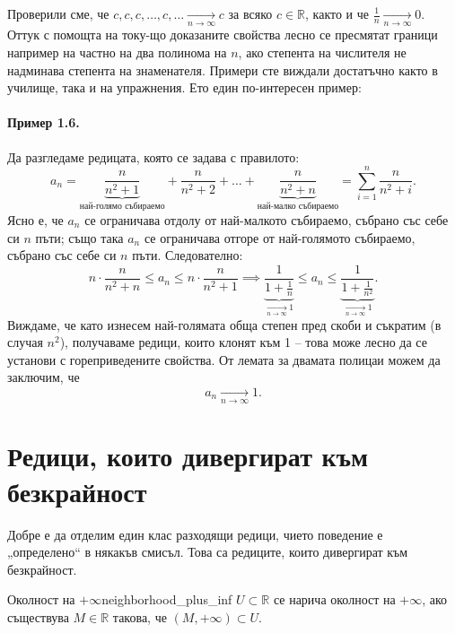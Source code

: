 Проверили сме, че $c, c, c, \dots, c, \dots \xrightarrow[n\to\infty]{} c$ за всяко $c \in \mathbb{R}$, както и че $\frac{1}{n} \xrightarrow[n\to\infty]{} 0$. Оттук с помощта на току-що доказаните свойства лесно се пресмятат граници например на частно на два полинома на $n$, ако степента на числителя не надминава степента на знаменателя. Примери сте виждали достатъчно както в училище, така и на упражнения. Ето един по-интересен пример:

\paragraph{Пример 1.6.}
Да разгледаме редицата, която се задава с правилото:
\[
a_n = \underbrace{\frac{n}{n^2 + 1}}_{\text{най-голямо събираемо}} + \frac{n}{n^2 + 2} + \dots + \underbrace{\frac{n}{n^2 + n}}_{\text{най-малко събираемо}} = \sum_{i=1}^n \frac{n}{n^2 + i}.
\]
Ясно е, че $a_n$ се ограничава отдолу от най-малкото събираемо, събрано със себе си $n$ пъти; също така $a_n$ се ограничава отгоре от най-голямото събираемо, събрано със себе си $n$ пъти. Следователно:
\[
n \cdot \frac{n}{n^2 + n} \le a_n \le n \cdot \frac{n}{n^2 + 1} \implies \underbrace{\frac{1}{1 + \frac{1}{n}}}_{\xrightarrow[n\to\infty]{} 1} \le a_n \le \underbrace{\frac{1}{1 + \frac{1}{n^2}}}_{\xrightarrow[n\to\infty]{} 1}.
\]
Виждаме, че като изнесем най-голямата обща степен пред скоби и съкратим (в случая $n^2$), получаваме редици, които клонят към 1 -- това може лесно да се установи с гореприведените свойства. От лемата за двамата полицаи можем да заключим, че
\[
a_n \xrightarrow[n\to\infty]{} 1.
\]

\section{Редици, които дивергират към безкрайност}

Добре е да отделим един клас разходящи редици, чието поведение е „определено“ в някакъв смисъл. Това са редиците, които дивергират към безкрайност.

\begin{definition}{Околност на $+\infty$}{neighborhood_plus_inf}
$U \subset \mathbb{R}$ се нарича околност на $+\infty$, ако съществува $M \in \mathbb{R}$ такова, че $(M, +\infty) \subset U$.
\end{definition}

